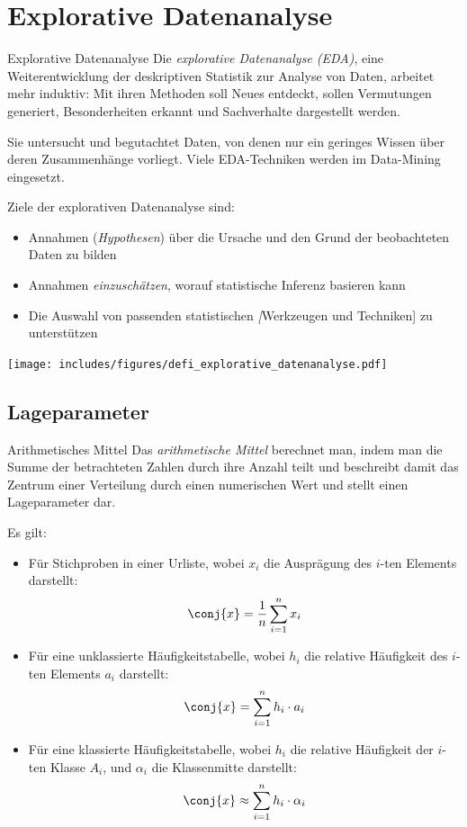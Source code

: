 \section{Explorative Datenanalyse}

\begin{defi}{Explorative Datenanalyse}
    Die \emph{explorative Datenanalyse (EDA)}, eine Weiterentwicklung der deskriptiven Statistik zur Analyse von Daten, arbeitet mehr induktiv: Mit ihren Methoden soll Neues entdeckt, sollen Vermutungen generiert, Besonderheiten erkannt und Sachverhalte dargestellt werden.

    Sie untersucht und begutachtet Daten, von denen nur ein geringes Wissen über deren Zusammenhänge vorliegt. Viele EDA-Techniken werden im Data-Mining eingesetzt.

    Ziele der explorativen Datenanalyse sind:
    \begin{itemize}
        \item Annahmen (\emph{Hypothesen}) über die Ursache und den Grund der beobachteten Daten zu bilden
        \item Annahmen \emph{einzuschätzen}, worauf statistische Inferenz basieren kann
        \item Die Auswahl von passenden statistischen \emph[Werkzeugen und Techniken] zu unterstützen
    \end{itemize}

    \centering
    \texttt{[image: includes/figures/defi\_explorative\_datenanalyse.pdf]}
\end{defi}

\subsection{Lageparameter}

\begin{defi}{Arithmetisches Mittel}
    Das \emph{arithmetische Mittel} berechnet man, indem man die Summe der betrachteten Zahlen durch ihre Anzahl teilt und beschreibt damit das Zentrum einer Verteilung durch einen numerischen Wert und stellt einen Lageparameter dar.

    Es gilt:
    \begin{itemize}
        \item Für Stichproben in einer Urliste, wobei $x_i$ die Ausprägung des $i$-ten Elements darstellt:
              \[
                  \conj{x} = \frac{1}{n} \sum_{i=1}^n x_i
              \]
        \item Für eine unklassierte Häufigkeitstabelle, wobei $h_i$ die relative Häufigkeit des $i$-ten Elements $a_i$ darstellt:
              \[
                  \conj{x} = \sum_{i=1}^n h_i \cdot a_i
              \]
        \item Für eine klassierte Häufigkeitstabelle, wobei $h_i$ die relative Häufigkeit der $i$-ten Klasse $A_i$, und $\alpha_i$ die Klassenmitte darstellt:
              \[
                  \conj{x} \approx \sum_{i=1}^n h_i \cdot \alpha_i
              \]
    \end{itemize}
\end{defi}

